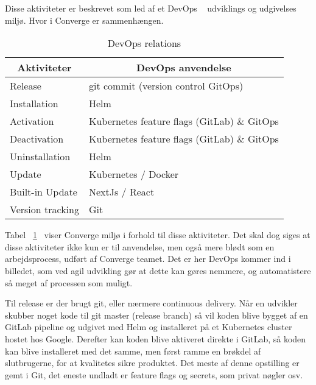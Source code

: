 Disse aktiviteter er beskrevet som led af et DevOps ~\cite{documentation_terms} udviklings og udgivelses miljø. Hvor i Converge er sammenhængen.

\begin{table}[H]
    \begin{small}
        \caption{DevOps relations}
        \label{tab:devops-relation}
        \begin{center}
            \begin{tabular}[c]{l|l}
                \multicolumn{1}{c|}{\textbf{Aktiviteter}} & 
                \multicolumn{1}{c}{\textbf{DevOps anvendelse}} \\
                \hline
                Release & git commit (version control GitOps) \\
                Installation & Helm \\
                Activation & Kubernetes feature flags  (GitLab) \& GitOps \\
                Deactivation & Kubernetes feature flags (GitLab) \& GitOps \\
                Uninstallation & Helm\\
                Update & Kubernetes / Docker ~\cite{documentation_terms}\\
                Built-in Update & NextJs / React \\
                Version tracking & Git \\
            \end{tabular}
        \end{center}
    \end{small}
\end{table}

Tabel ~\ref{tab:devops-relation}~\cite{documentation_terms} viser Converge miljø i forhold til disse aktiviteter. Det skal dog siges at disse aktiviteter ikke kun er til anvendelse, men også mere blødt som en arbejdsprocess, udført af Converge teamet. Det er her DevOps kommer ind i billedet, som ved agil udvikling gør at dette kan gøres nemmere, og automatistere så meget af processen som muligt.

Til release er der brugt git, eller nærmere continuous delivery. Når en udvikler skubber noget kode til git master (release branch) så vil koden blive bygget af en GitLab pipeline og udgivet med Helm og installeret på et Kubernetes cluster hostet hos Google. Derefter kan koden blive aktiveret direkte i GitLab, så koden kan blive installeret med det samme, men først ramme en brøkdel af slutbrugerne, for at kvalitetes sikre produktet. Det meste af denne opstilling er gemt i Git, det eneste undladt er feature flags  og secrets, som privat nøgler osv.

